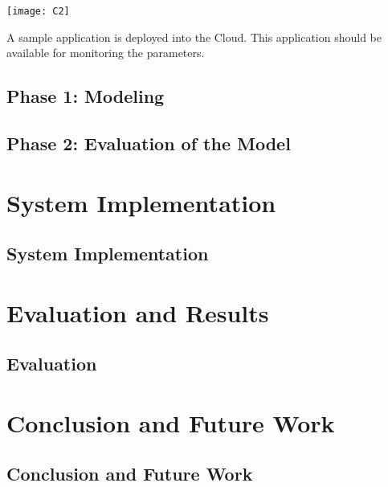\documentclass[article,type=msc,colorback,12pt,accentcolor=tud7b]{tudthesis}
\begin{document}
\texttt{[image: C2]} 	
 	
 	A sample application is deployed into the Cloud. This application should be available for monitoring the parameters.
 	
 	\subsection{Phase 1: Modeling}
 	
 		\subsection{Phase 2: Evaluation of the Model}

 \cleardoublepage
 \section{System Implementation}
 \subsection{System Implementation}

 \cleardoublepage	  
 \section{Evaluation and Results}	  
 \subsection{Evaluation}
 
 \cleardoublepage
 \section{Conclusion and Future Work}	  
 \subsection{Conclusion and Future Work}

\clearpage
	  

	  
\end{document}
